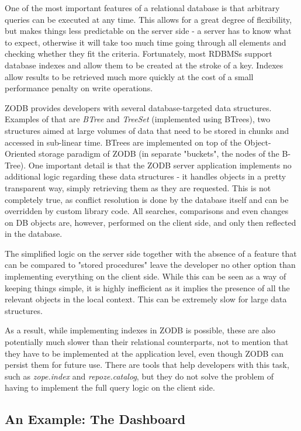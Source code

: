 One of the most important features of a relational database is that arbitrary queries can be executed at any time. This allows for a great degree of flexibility, but makes things less predictable on the server side - a server has to know what to expect, otherwise it will take too much time going through all elements and checking whether they fit the criteria. Fortunately, most RDBMSs support database indexes and allow them to be created at the stroke of a key. Indexes allow results to be retrieved much more quickly at the cost of a small performance penalty on write operations.

ZODB provides developers with several database-targeted data structures. Examples of that are \textit{BTree } and \textit{TreeSet} (implemented using BTrees), two structures aimed at large volumes of data that need to be stored in chunks and accessed in sub-linear time. BTrees are implemented on top of the Object-Oriented storage paradigm of ZODB (in separate "buckets", the nodes of the B-Tree). One important detail is that the ZODB server application implements no additional logic regarding these data structures - it handles objects in a pretty transparent way, simply retrieving them as they are requested. This is not completely true, as conflict resolution is done by the database itself and can be overridden by custom library code. All searches, comparisons and even changes on DB objects are, however, performed on the client side, and only then reflected in the database.

The simplified logic on the server side together with the absence of a feature that can be compared to "stored procedures" leave the developer no other option than implementing everything on the client side. While this can be seen as a way of keeping things simple, it is highly inefficient as it implies the presence of all the relevant objects in the local context. This can be extremely slow for large data structures.

As a result, while implementing indexes in ZODB is possible, these are also potentially much slower than their relational counterparts, not to mention that they have to be implemented at the application level, even though ZODB can persist them for future use. There are tools that help developers with this task, such as \textit{zope.index} and \textit{repoze.catalog}, but they do not solve the problem of having to implement the full query logic on the client side.

\subsection{An Example: The Dashboard}
 
